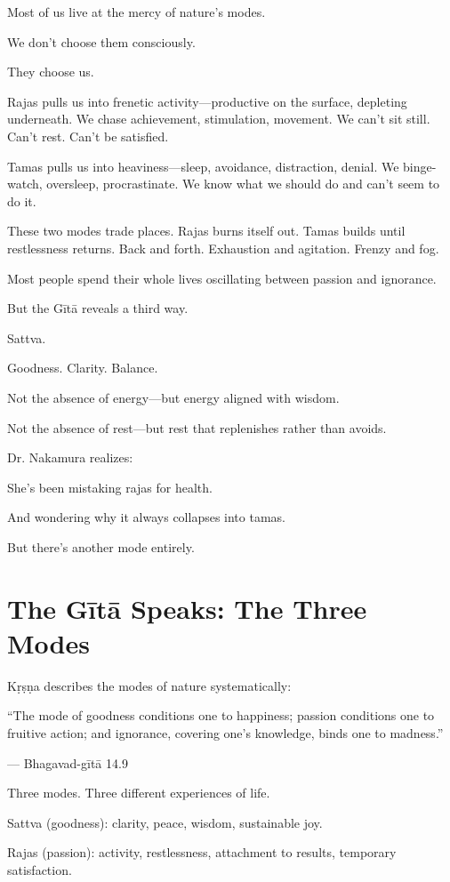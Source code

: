 \documentclass[11pt,twoside]{book}
\begin{document}
Most of us live at the mercy of nature's modes.

We don't choose them consciously.

They choose us.

Rajas pulls us into frenetic activity—productive on the surface, depleting underneath. We chase achievement, stimulation, movement. We can't sit still. Can't rest. Can't be satisfied.

Tamas pulls us into heaviness—sleep, avoidance, distraction, denial. We binge-watch, oversleep, procrastinate. We know what we should do and can't seem to do it.

These two modes trade places. Rajas burns itself out. Tamas builds until restlessness returns. Back and forth. Exhaustion and agitation. Frenzy and fog.

Most people spend their whole lives oscillating between passion and ignorance.

But the Gītā reveals a third way.

Sattva.

Goodness. Clarity. Balance.

Not the absence of energy—but energy aligned with wisdom.

Not the absence of rest—but rest that replenishes rather than avoids.

Dr. Nakamura realizes:

She's been mistaking rajas for health.

And wondering why it always collapses into tamas.

But there's another mode entirely.

\section*{The Gītā Speaks: The Three Modes}

Kṛṣṇa describes the modes of nature systematically:

\begin{pullquote}
``The mode of goodness conditions one to happiness; passion conditions one to fruitive action; and ignorance, covering one's knowledge, binds one to madness.''

--- Bhagavad-gītā 14.9
\end{pullquote}

Three modes. Three different experiences of life.

Sattva (goodness): clarity, peace, wisdom, sustainable joy.

Rajas (passion): activity, restlessness, attachment to results, temporary satisfaction.
\end{document}
